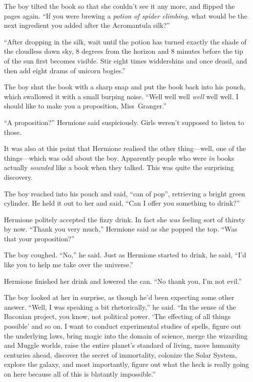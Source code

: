 The boy tilted the book so that she couldn’t see it any more, and flipped the pages again. “If you were brewing a \emph{potion of spider climbing,} what would be the next ingredient you added after the Acromantula silk?”

“After dropping in the silk, wait until the potion has turned exactly the shade of the cloudless dawn sky, 8 degrees from the horizon and 8 minutes before the tip of the sun first becomes visible. Stir eight times widdershins and once deasil, and then add eight drams of unicorn bogies.”

The boy shut the book with a sharp snap and put the book back into his pouch, which swallowed it with a small burping noise. “Well well well \emph{well} well well. I should like to make you a proposition, Miss~Granger.”

“A proposition?” Hermione said suspiciously. Girls weren’t supposed to listen to those.

It was also at this point that Hermione realised the other thing—well, one of the things—which was odd about the boy. Apparently people who were \emph{in} books actually \emph{sounded} like a book when they talked. This was quite the surprising discovery.

The boy reached into his pouch and said, “can of pop”, retrieving a bright green cylinder. He held it out to her and said, “Can I offer you something to drink?”

Hermione politely accepted the fizzy drink. In fact she \emph{was} feeling sort of thirsty by now. “Thank you very much,” Hermione said as she popped the top. “Was that your proposition?”

The boy coughed. “No,” he said. Just as Hermione started to drink, he said, “I’d like you to help me take over the universe.”

Hermione finished her drink and lowered the can. “No thank you, I’m not evil.”

The boy looked at her in surprise, as though he’d been expecting some other answer. “Well, I was speaking a bit rhetorically,” he said. “In the sense of the Baconian project, you know, not political power. ‘The effecting of all things possible’ and so on. I want to conduct experimental studies of spells, figure out the underlying laws, bring magic into the domain of science, merge the wizarding and Muggle worlds, raise the entire planet’s standard of living, move humanity centuries ahead, discover the secret of immortality, colonize the Solar System, explore the galaxy, and most importantly, figure out what the heck is really going on here because all of this is blatantly impossible.”


